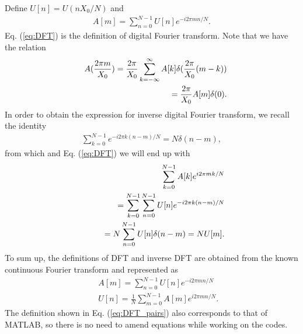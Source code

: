 Define $U[n] = U(n X_0 / N)$ and
\begin{eqnarray}
	A[m] = \sum_{n = 0}^{N - 1} U[n] e^{-i 2\pi m n/ N}.
	\label{eq:DFT}
\end{eqnarray}
Eq. (\ref{eq:DFT}) is the definition of digital Fourier transform. Note that we have the relation
\begin{eqnarray}
	&&A(\frac{2 \pi m}{X_0}) = \frac{2\pi}{X_0} \sum_{k = -\infty}^{\infty} A[k]
		\delta(\frac{2 \pi}{X_0} (m - k))
	\nonumber\\
	&&\hspace{0.5in}=  \frac{2\pi}{X_0} A[m] \delta(0).
\end{eqnarray}
In order to obtain the expression for inverse digital Fourier transform, we recall the identity
\begin{eqnarray}
	\sum_{k = 0}^{N - 1} e^{-i 2 \pi k(n - m)/N} = N \delta(n - m),
\end{eqnarray}
from which and Eq. (\ref{eq:DFT}) we will end up with
\begin{eqnarray}
	&&\sum_{k = 0}^{N - 1} A[k] e^{i 2 \pi mk/N} 
	\nonumber\\
	&&\hspace{0.3in} = \sum_{k = 0}^{N - 1} \sum_{n = 0}^{N - 1} U[n] e^{-i 2 \pi k(n - m)/N}
	\nonumber\\
	&&\hspace{0.3in} = N \sum_{n = 0}^{N - 1} U[n] \delta(n - m) = N U[m].
\end{eqnarray}
To sum up, the definitions of DFT and inverse DFT are obtained from the known continuous Fourier transform and represented as
\begin{eqnarray}
	&&A[m] = \sum_{n = 0}^{N - 1} U[n] e^{-i 2\pi m n/ N}
	\nonumber\\
	&&U[n] = \frac{1}{N} \sum_{m = 0}^{N - 1} A[m] e^{i 2 \pi mn/N}.
	\label{eq:DFT_pairs}
\end{eqnarray}
The definition shown in Eq. (\ref{eq:DFT_pairs}) also corresponds to that of MATLAB, so there is no need to amend equations while working on the codes.